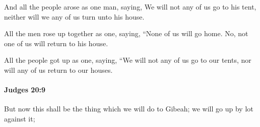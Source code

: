 			\begin{versebox}
					\item[BHS] 
					\item[ASV] And all the people arose as one man, saying, We will not any of us go to his tent, neither will we any of us turn unto his house.
					\item[NIV] All the men rose up together as one, saying, “None of us will go home. No, not one of us will return to his house.
					\item[NRSV] All the people got up as one, saying, “We will not any of us go to our tents, nor will any of us return to our houses.
			\end{versebox}

		\paragraph{Judges 20:9} %
			\label{JUDGES-20-9}

			But now this shall be the thing which we will do to Gibeah; we will go up by lot against it;

